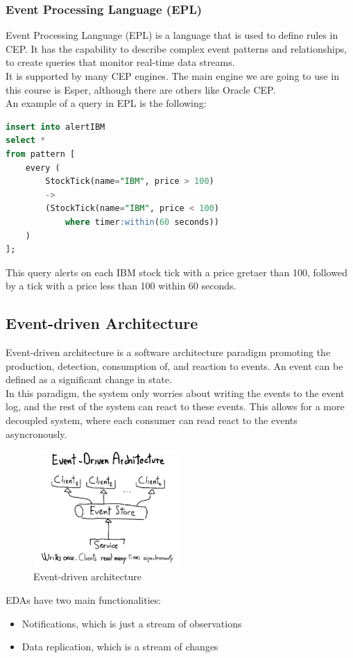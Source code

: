 \subsubsection{Event Processing Language (EPL)}

Event Processing Language (EPL) is a language that is used to 
define rules in CEP. It has the capability to describe complex
event patterns and relationships, to create queries that monitor
real-time data streams.\\

It is supported by many CEP engines. The main engine we are going to use 
in this course is Esper, although there are others like Oracle CEP.\\

An example of a query in EPL is the following:\\

\begin{lstlisting}[language=SQL]
insert into alertIBM
select *
from pattern [
    every (
        StockTick(name="IBM", price > 100)
        ->
        (StockTick(name="IBM", price < 100)
            where timer:within(60 seconds))
    )
];
\end{lstlisting}

This query alerts on each IBM stock tick with a price gretaer than 100,
followed by a tick with a price less than 100 within 60 seconds.\\

\subsection{Event-driven Architecture}

Event-driven architecture is a software architecture paradigm promoting the production,
detection, consumption of, and reaction to events. An event can be defined as a significant
change in state.\\

In this paradigm, the system only worries about writing the events to the event log, and
the rest of the system can react to these events. This allows for a more decoupled system,
where each consumer can read react to the events asyncronously.\\

\begin{figure}[H]
    \centering
    \includegraphics[width=0.5\textwidth]{figures/image_EDA.png}
    \caption{Event-driven architecture}
    \label{fig:event_driven_arch}
\end{figure}

EDAs have two main functionalities:

\begin{itemize}
    \item Notifications, which is just a stream of observations
    \item Data replication, which is a stream of changes
\end{itemize}
